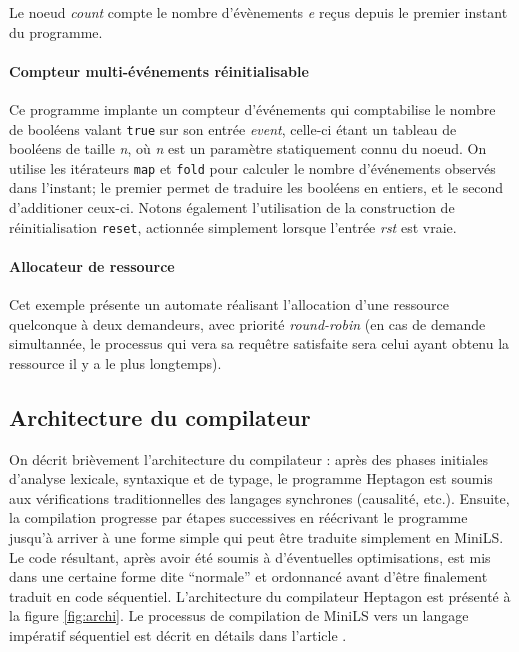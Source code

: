 \documentclass[a4paper]{article}
\newcommand{\LANG}{{\sc Heptagon}}
\begin{document}


Le noeud \textit{count} compte le nombre d'\'ev\`enements \textit{e} re\c{c}us depuis le
premier instant du programme.

\paragraph{Compteur multi-\'ev\'enements r\'einitialisable}



Ce programme implante un compteur d'\'ev\'enements qui comptabilise le
nombre de bool\'eens valant \texttt{true} sur son entr\'ee
\textit{event}, celle-ci \'etant un tableau de bool\'eens de taille
\textit{n}, o\`u \textit{n} est un param\`etre statiquement connu du
noeud. On utilise les it\'erateurs \texttt{map} et \texttt{fold} pour
calculer le nombre d'\'ev\'enements observ\'es dans l'instant; le
premier permet de traduire les bool\'eens en entiers, et le second
d'additioner ceux-ci. Notons \'egalement l'utilisation de la
construction de r\'einitialisation \texttt{reset}, actionn\'ee
simplement lorsque l'entr\'ee \textit{rst} est vraie.

\paragraph{Allocateur de ressource}



Cet exemple pr\'esente un automate r\'ealisant l'allocation d'une ressource
quelconque \`a deux demandeurs, avec priorit\'e \textit{round-robin} (en cas de
demande simultann\'ee, le processus qui vera sa requ\^etre satisfaite sera celui
ayant obtenu la ressource il y a le plus longtemps).

\subsection{Architecture du compilateur}

On d\'ecrit bri\`evement l'architecture du compilateur : apr\`es des
phases initiales d'analyse lexicale, syntaxique et de typage, le
programme \LANG{} est soumis aux v\'erifications traditionnelles des
langages synchrones (causalit\'e, etc.). Ensuite, la compilation
progresse par \'etapes successives en r\'e\'ecrivant le programme jusqu'\`a
arriver \`a une forme simple qui peut \^etre traduite simplement en
MiniLS. Le code r\'esultant, apr\`es avoir \'et\'e soumis \`a
d'\'eventuelles optimisations, est mis dans une certaine forme dite
``normale'' et ordonnanc\'e avant d'\^etre finalement traduit en code
s\'equentiel. L'architecture du compilateur \LANG{} est pr\'esent\'e
\`a la figure \ref{fig:archi}. Le processus de compilation de MiniLS
vers un langage imp\'eratif s\'equentiel est d\'ecrit en d\'etails dans
l'article \cite{lctes08a}.
\end{document}
